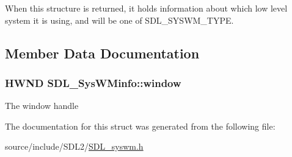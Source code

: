 When this structure is returned, it holds information about which low level system it is using, and will be one of S\+D\+L\+\_\+\+S\+Y\+S\+W\+M\+\_\+\+T\+Y\+P\+E. 

\subsection{Member Data Documentation}
\hypertarget{struct_s_d_l___sys_w_minfo_af06225591ff07e837bbd037728a525b9}{}
\subsubsection[{window}]{\setlength{\rightskip}{0pt plus 5cm}H\+W\+N\+D S\+D\+L\+\_\+\+Sys\+W\+Minfo\+::window}\label{struct_s_d_l___sys_w_minfo_af06225591ff07e837bbd037728a525b9}
The window handle 

The documentation for this struct was generated from the following file\+:\begin{DoxyCompactItemize}
\item 
source/include/\+S\+D\+L2/\hyperlink{_s_d_l__syswm_8h}{S\+D\+L\+\_\+syswm.\+h}\end{DoxyCompactItemize}
